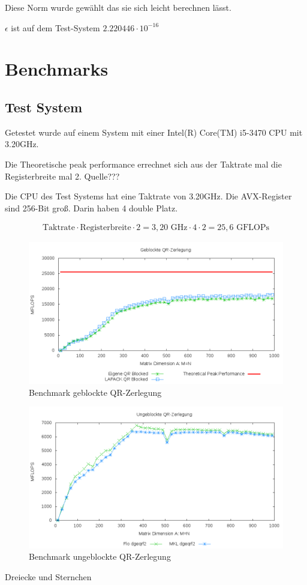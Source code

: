 Diese Norm wurde gewählt das sie sich leicht berechnen lässt.

$\epsilon$ ist auf dem Test-System $2.220446\cdot10^{-16}$


\section{Benchmarks}

\subsection{Test System}

Getestet wurde auf einem System mit einer Intel(R) Core(TM) i5-3470 CPU mit 3.20GHz. 

Die Theoretische peak performance errechnet sich aus der Taktrate mal die Registerbreite mal 2. Quelle???


Die CPU des Test Systems hat eine Taktrate von 3.20GHz.
Die AVX-Register sind 256-Bit groß. Darin haben 4 double Platz.

\begin{align*}
	\text{Taktrate} \cdot \text{Registerbreite} \cdot 2= 3,20 \text{ GHz} \cdot 4 \cdot 2 = 25,6 \text{ GFLOPs}
\end{align*}

\begin{figure}[H]
	\includegraphics[width=\textwidth]{images/blk.png}
	\caption{Benchmark geblockte QR-Zerlegung}
	\label{img:blk}
\end{figure}

\begin{figure}[H]
	\includegraphics[width=\textwidth]{images/unblk.png}
	\caption{Benchmark ungeblockte QR-Zerlegung}
	\label{img:unblk}
\end{figure}

Dreiecke und Sternchen









	 